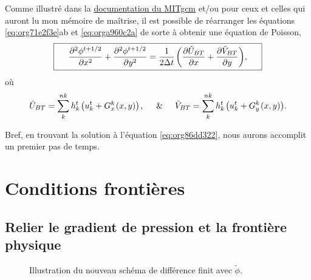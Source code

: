 \documentclass[10pt]{article}
\numberwithin{equation}{section}
\newcommand{\pt}{\hspace{1pt}} %
\begin{document}
Comme illustré dans la \href{http://mitgcm.org/public/r2\_manual/final/online\_documents/node33.html}{documentation du MITgcm} et/ou pour ceux et celles qui auront lu mon mémoire de maîtrise, il est possible de réarranger les équations \ref{eq:org71e2f3e}ab et \ref{eq:orga960c2a} de sorte à obtenir une équation de Poisson,
\begin{equation}
\label{eq:org86dd322}
\boxed{\hspace{0.5cm} \pdv[2]{\phi^{t+1/2}}{x} + \pdv[2]{\phi^{t+1/2}}{y} = \frac{1}{2\Delta t}\pt \qty(\pdv{ \tilde{U}_{BT}}{x} + \pdv{\tilde{V}_{BT}}{y}),\hspace{0.5cm} }
\end{equation}
où
\begin{equation}
\tilde{U}_{BT} = \sum_k^{nk} h_k^t\pt \qty(u^t_k + G^k_x\pt(x,y))\pt,
\hspace{0.5cm}\&\hspace{0.5cm}
\tilde{V}_{BT} = \sum_k^{nk} h^t_k\pt \qty(u^t_k + G^k_y\pt(x,y)).
\end{equation}

Bref, en trouvant la solution à l'équation \ref{eq:org86dd322}, nous aurons accomplit un premier pas de temps. \newpage
\section{Conditions frontières}
\label{sec:org53523d7}

\subsection{Relier le gradient de pression et la frontière physique}
\label{sec:orge17fdc2}

\begin{wrapfigure}[13]{r}{0.35\textwidth}
\vspace{-\baselineskip}
\centering
{}
\caption{\label{org21fcb0a}Illustration du nouveau schéma de différence finit avec \(\tilde{\phi}\).}
\end{wrapfigure}
\end{document}
